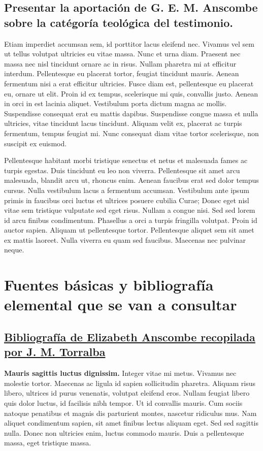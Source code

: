 \documentclass[../main.tex]{subfiles}
\begin{document}
\subsection{Presentar la aportación de G. E. M. Anscombe sobre la catégoría teológica del testimonio.}
Etiam imperdiet accumsan sem, id porttitor lacus eleifend nec. Vivamus vel sem ut tellus volutpat ultricies eu vitae massa. Nunc et urna diam. Praesent nec massa nec nisl tincidunt ornare ac in risus. Nullam pharetra mi at efficitur interdum. Pellentesque eu placerat tortor, feugiat tincidunt mauris. Aenean fermentum nisi a erat efficitur ultricies. Fusce diam est, pellentesque eu placerat eu, ornare ut elit. Proin id ex tempus, scelerisque mi quis, convallis justo. Aenean in orci in est lacinia aliquet. Vestibulum porta dictum magna ac mollis. Suspendisse consequat erat eu mattis dapibus. Suspendisse congue massa et nulla ultricies, vitae tincidunt lacus tincidunt. Aliquam velit ex, placerat ac turpis fermentum, tempus feugiat mi. Nunc consequat diam vitae tortor scelerisque, non suscipit ex euismod.

Pellentesque habitant morbi tristique senectus et netus et malesuada fames ac turpis egestas. Duis tincidunt eu leo non viverra. Pellentesque sit amet arcu malesuada, blandit arcu ut, rhoncus enim. Aenean faucibus erat sed dolor tempus cursus. Nulla vestibulum lacus a fermentum accumsan. Vestibulum ante ipsum primis in faucibus orci luctus et ultrices posuere cubilia Curae; Donec eget nisl vitae sem tristique vulputate sed eget risus. Nullam a congue nisi. Sed sed lorem id arcu finibus condimentum. Phasellus a orci a turpis fringilla volutpat. Proin id auctor sapien. Aliquam ut pellentesque tortor. Pellentesque aliquet sem sit amet ex mattis laoreet. Nulla viverra eu quam sed faucibus. Maecenas nec pulvinar neque.


\section{Fuentes básicas y bibliografía elemental que se van a consultar}
\subsection{\href{http://www.unav.es/filosofia/jmtorralba/anscombe/G.E.M.\_Anscombe\_Bibliography.htm}{Bibliografía de Elizabeth Anscombe recopilada por J. M. Torralba}}

\textbf{Mauris sagittis luctus dignissim.} Integer vitae mi metus. Vivamus nec molestie tortor. Maecenas ac ligula id sapien sollicitudin pharetra. Aliquam risus libero, ultrices id purus venenatis, volutpat eleifend eros. Nullam feugiat libero quis dolor luctus, id facilisis nibh tempor. Ut id convallis mauris. Cum sociis natoque penatibus et magnis dis parturient montes, nascetur ridiculus mus. Nam aliquet condimentum sapien, sit amet finibus lectus aliquam eget. Sed sed sagittis nulla. Donec non ultricies enim, luctus commodo mauris. Duis a pellentesque massa, eget tristique massa.
\end{document}
